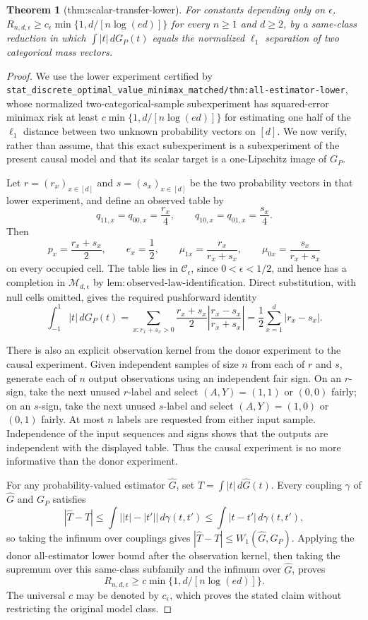\documentclass{article}
\newtheorem{theorem}{Theorem}
\begin{document}
\begin{theorem}[thm:scalar-transfer-lower]\label{thm:scalar-transfer-lower}
For constants depending only on \(\epsilon\), \(R_{n,d,\epsilon}\ge c_\epsilon\min\{1,d/[n\log(ed)]\}\) for every \(n\ge1\) and \(d\ge2\), by a same-class reduction in which \(\int|t|\,dG_P(t)\) equals the normalized \(\ell_1\) separation of two categorical mass vectors.
\end{theorem}
\begin{proof}
We use the lower experiment certified by \texttt{stat\_discrete\_optimal\_value\_minimax\_matched/thm:all-estimator-lower}, whose normalized two-categorical-sample subexperiment has squared-error minimax risk at least
\(c\min\{1,d/[n\log(ed)]\}\) for estimating one half of the \(\ell_1\) distance between two unknown probability vectors on \([d]\).  We now verify, rather than assume, that this exact subexperiment is a subexperiment of the present causal model and that its scalar target is a one-Lipschitz image of \(G_P\).

Let \(r=(r_x)_{x\in[d]}\) and \(s=(s_x)_{x\in[d]}\) be the two probability vectors in that lower experiment, and define an observed table by
\[
q_{11,x}=q_{00,x}=\frac{r_x}{4},
\qquad
q_{10,x}=q_{01,x}=\frac{s_x}{4}.
\]
Then
\[
p_x=\frac{r_x+s_x}{2},\qquad e_x=\frac12,
\qquad
\mu_{1x}=\frac{r_x}{r_x+s_x},\qquad
\mu_{0x}=\frac{s_x}{r_x+s_x}
\]
on every occupied cell.  The table lies in \(\mathcal C_\epsilon\), since \(0<\epsilon<1/2\), and hence has a completion in \(\mathcal M_{d,\epsilon}\) by \(\mathrm{lem:observed\mbox{-}law\mbox{-}identification}\).  Direct substitution, with null cells omitted, gives the required pushforward identity
\[
\int_{-1}^1|t|\,dG_P(t)
=\sum_{x:r_x+s_x>0}\frac{r_x+s_x}{2}
  \left|\frac{r_x-s_x}{r_x+s_x}\right|
=\frac12\sum_{x=1}^d|r_x-s_x|.
\]

There is also an explicit observation kernel from the donor experiment to the causal experiment.  Given independent samples of size \(n\) from each of \(r\) and \(s\), generate each of \(n\) output observations using an independent fair sign.  On an \(r\)-sign, take the next unused \(r\)-label and select \((A,Y)=(1,1)\) or \((0,0)\) fairly; on an \(s\)-sign, take the next unused \(s\)-label and select \((A,Y)=(1,0)\) or \((0,1)\) fairly.  At most \(n\) labels are requested from either input sample.  Independence of the input sequences and signs shows that the outputs are independent with the displayed table.  Thus the causal experiment is no more informative than the donor experiment.

For any probability-valued estimator \(\widehat G\), set \(\widehat T=\int|t|\,d\widehat G(t)\).  Every coupling \(\gamma\) of \(\widehat G\) and \(G_P\) satisfies
\[
|\widehat T-T|
\leq\int\bigl||t|-|t'|\bigr|\,d\gamma(t,t')
\leq\int|t-t'|\,d\gamma(t,t'),
\]
so taking the infimum over couplings gives \(|\widehat T-T|\leq W_1(\widehat G,G_P)\).  Applying the donor all-estimator lower bound after the observation kernel, then taking the supremum over this same-class subfamily and the infimum over \(\widehat G\), proves
\[
R_{n,d,\epsilon}\geq c\min\{1,d/[n\log(ed)]\}.
\]
The universal \(c\) may be denoted by \(c_\epsilon\), which proves the stated claim without restricting the original model class.
\end{proof}
\end{document}
